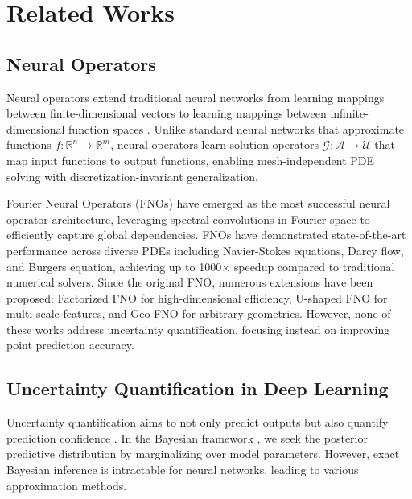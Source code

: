 \section{Related Works}

\subsection{Neural Operators}

Neural operators extend traditional neural networks from learning mappings between finite-dimensional vectors to
learning mappings between infinite-dimensional function spaces \cite{lu2021deeponet,chen1995universal,kovachki2023neural}. Unlike 
standard neural networks that approximate functions $f: \mathbb{R}^n \rightarrow \mathbb{R}^m$, neural operators 
learn solution operators $\mathcal{G}: \mathcal{A} \rightarrow \mathcal{U}$ that map input functions to output 
functions, enabling mesh-independent PDE solving with discretization-invariant generalization.

Fourier Neural Operators (FNOs) \cite{li2020fourier} have emerged as the most successful neural operator 
architecture, leveraging spectral convolutions in Fourier space to efficiently capture global dependencies. FNOs 
have demonstrated state-of-the-art performance across diverse PDEs including Navier-Stokes equations, Darcy flow, 
and Burgers equation, achieving up to 1000$\times$ speedup compared to traditional numerical solvers. Since the 
original FNO, numerous extensions have been proposed: Factorized FNO \cite{tran2021factorized} for high-dimensional 
efficiency, U-shaped FNO \cite{wen2022u} for multi-scale features, and Geo-FNO \cite{li2022fourier} for arbitrary 
geometries. However, none of these works address uncertainty quantification, focusing instead on improving point 
prediction accuracy.

\subsection{Uncertainty Quantification in Deep Learning}

Uncertainty quantification aims to not only predict outputs but also quantify prediction confidence
\cite{abdar2021review}. In the Bayesian framework \cite{bishop2006pattern}, we seek the posterior predictive
distribution by marginalizing over model parameters. However, exact Bayesian inference is intractable for neural
networks, leading to various approximation methods.


